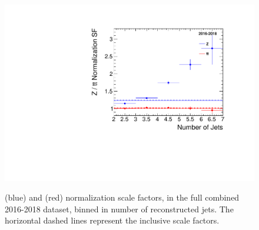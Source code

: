 \begin{figure}[H]
       \centering
       {\includegraphics[width=\textwidth]{Images/Analysis/mumuScaleFactors_JetCount.pdf}}
       \caption{\ZJETS (blue) and \ttbar (red) normalization scale factors, in the full combined 2016-2018 dataset, binned in number of reconstructed jets. The horizontal dashed lines represent the inclusive scale factors.}
       \label{fig:znjets}
\end{figure}

